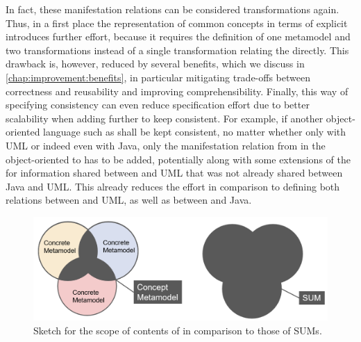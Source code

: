 In fact, these manifestation relations can be considered transformations again.
Thus, in a first place the representation of common concepts in terms of explicit \commonalities introduces further effort, because it requires the definition of one metamodel and two transformations instead of a single transformation relating the \metaclasses directly.
This drawback is, however, reduced by several benefits, which we discuss in \autoref{chap:improvement:benefits}, in particular mitigating trade-offs between correctness and reusability and improving comprehensibility.
Finally, this way of specifying consistency can even reduce specification effort due to better scalability when adding further \concretemetamodels to keep consistent.
For example, if another object-oriented language such as \cplusplus shall be kept consistent, no matter whether only with \gls{UML} or indeed even with Java, only the manifestation relation from \commonalities in the object-oriented \conceptmetamodel to \cplusplus has to be added, potentially along with some extensions of the \conceptmetamodel for information shared between \cplusplus and \gls{UML} that was not already shared between Java and \gls{UML}.
This already reduces the effort in comparison to defining both relations between \cplusplus and \gls{UML}, as well as between \cplusplus and Java.

\begin{figure}
    \centering
    \includegraphics[width=\textwidth]{figures/quality/improvement/commonalities_and_sums.png}
    \caption[Commonalities compared to ]{Sketch for the scope of contents of \conceptmetamodels in comparison to those of \glspl{SUM}.}
    \label{fig:improvement:commonalities_and_sums}
\end{figure}

